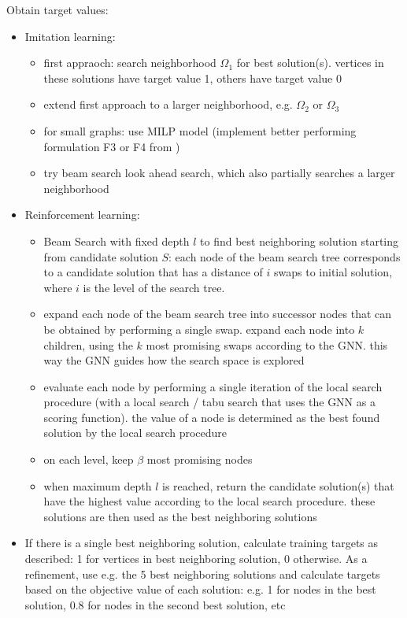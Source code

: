 \documentclass[draft,final]{vutinfth} %
\begin{document}
Obtain target values: 
\begin{itemize}
    \item Imitation learning: 
    \begin{itemize}
        \item first appraoch: search neighborhood $\Omega_1$ for best solution(s). vertices in these solutions have target value 1, others have target value 0
        \item extend first approach to a larger neighborhood, e.g. $\Omega_2$ or $\Omega_3$
        \item for small graphs: use MILP model (implement better performing formulation F3 or F4 from \cite{VeremyevPBP16})
        \item try beam search look ahead search, which also partially searches a larger neighborhood
    \end{itemize}
    \item Reinforcement learning:
    \begin{itemize}
        \item Beam Search with fixed depth $l$ to find best neighboring solution starting from candidate solution $S$: each node of the beam search tree corresponds to a candidate solution that has a distance of $i$ swaps to initial solution, where $i$ is the level of the search tree.
        \item expand each node of the beam search tree into successor nodes that can be obtained by performing a single swap. expand each node into $k$ children, using the $k$ most promising swaps according to the GNN. this way the GNN guides how the search space is explored
        \item evaluate each node by performing a single iteration of the local search procedure (with a local search / tabu search that uses the GNN as a scoring function). the value of a node is determined as the best found solution by the local search procedure
        \item on each level, keep $\beta$ most promising nodes
        \item when maximum depth $l$ is reached, return the candidate solution(s) that have the highest value according to the local search procedure. these solutions are then used as the best neighboring solutions 
    \end{itemize}
    \item If there is a single best neighboring solution, calculate training targets as described: 1 for vertices in best neighboring solution, 0 otherwise. As a refinement, use e.g. the 5 best neighboring solutions and calculate targets based on the objective value of each solution: e.g. 1 for nodes in the best solution, 0.8 for nodes in the second best solution, etc 
\end{itemize}
\end{document}
